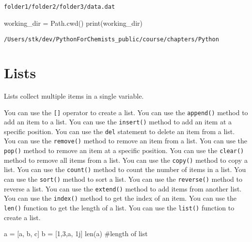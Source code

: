 \documentclass[
  letterpaper,
  DIV=11,
  numbers=noendperiod]{scrreprt}
\newenvironment{Shaded}{\begin{snugshade}}{\end{snugshade}}
\newcommand{\BuiltInTok}[1]{\textcolor[rgb]{0.00,0.23,0.31}{#1}}
\newcommand{\CommentTok}[1]{\textcolor[rgb]{0.37,0.37,0.37}{#1}}
\newcommand{\DecValTok}[1]{\textcolor[rgb]{0.68,0.00,0.00}{#1}}
\newcommand{\NormalTok}[1]{\textcolor[rgb]{0.00,0.23,0.31}{#1}}
\newcommand{\OperatorTok}[1]{\textcolor[rgb]{0.37,0.37,0.37}{#1}}
\newcommand{\OtherTok}[1]{\textcolor[rgb]{0.00,0.23,0.31}{#1}}
\newcommand{\StringTok}[1]{\textcolor[rgb]{0.13,0.47,0.30}{#1}}
\begin{document}
\begin{verbatim}
folder1/folder2/folder3/data.dat
\end{verbatim}

\begin{Shaded}
\begin{Highlighting}[]
\NormalTok{working\_dir }\OperatorTok{=}\NormalTok{ Path.cwd()}
\BuiltInTok{print}\NormalTok{(working\_dir)}
\end{Highlighting}
\end{Shaded}

\begin{verbatim}
/Users/stk/dev/PythonForChemists_public/course/chapters/Python
\end{verbatim}

\chapter*{Lists}\label{lists}


Lists collect multiple items in a single variable.

You can use the \texttt{{[}{]}} operator to create a list. You can use
the \texttt{append()} method to add an item to a list. You can use the
\texttt{insert()} method to add an item at a specific position. You can
use the \texttt{del} statement to delete an item from a list. You can
use the \texttt{remove()} method to remove an item from a list. You can
use the \texttt{pop()} method to remove an item at a specific position.
You can use the \texttt{clear()} method to remove all items from a list.
You can use the \texttt{copy()} method to copy a list. You can use the
\texttt{count()} method to count the number of items in a list. You can
use the \texttt{sort()} method to sort a list. You can use the
\texttt{reverse()} method to reverse a list. You can use the
\texttt{extend()} method to add items from another list. You can use the
\texttt{index()} method to get the index of an item. You can use the
\texttt{len()} function to get the length of a list. You can use the
\texttt{list()} function to create a list.

\begin{Shaded}
\begin{Highlighting}[]
\NormalTok{a }\OperatorTok{=}\NormalTok{ [}\StringTok{\textquotesingle{}a\textquotesingle{}}\NormalTok{, }\StringTok{\textquotesingle{}b\textquotesingle{}}\NormalTok{, }\StringTok{\textquotesingle{}c\textquotesingle{}}\NormalTok{]}
\NormalTok{b }\OperatorTok{=}\NormalTok{ [}\DecValTok{1}\NormalTok{,}\DecValTok{3}\NormalTok{,}\StringTok{\textquotesingle{}a\textquotesingle{}}\NormalTok{, }\OtherTok{1j}\NormalTok{]}
\BuiltInTok{len}\NormalTok{(a) }\CommentTok{\#length of list}
\end{Highlighting}
\end{Shaded}
\end{document}
